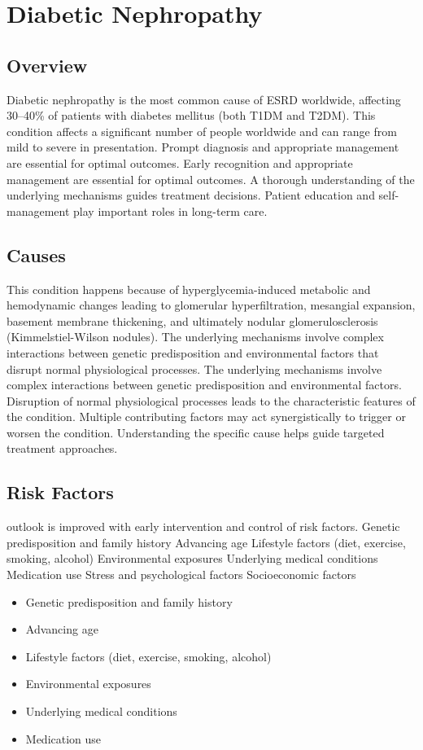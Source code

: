 \chapter{Diabetic Nephropathy}
\label{sec:Diabetic Nephropathy}

\section{Overview}
Diabetic nephropathy is the most common cause of ESRD worldwide, affecting 30--40\% of patients with diabetes mellitus (both T1DM and T2DM). This condition affects a significant number of people worldwide and can range from mild to severe in presentation. Prompt diagnosis and appropriate management are essential for optimal outcomes. Early recognition and appropriate management are essential for optimal outcomes. A thorough understanding of the underlying mechanisms guides treatment decisions. Patient education and self-management play important roles in long-term care.
\section{Causes}
This condition happens because of hyperglycemia-induced metabolic and hemodynamic changes leading to glomerular hyperfiltration, mesangial expansion, basement membrane thickening, and ultimately nodular glomerulosclerosis (Kimmelstiel-Wilson nodules). The underlying mechanisms involve complex interactions between genetic predisposition and environmental factors that disrupt normal physiological processes. The underlying mechanisms involve complex interactions between genetic predisposition and environmental factors. Disruption of normal physiological processes leads to the characteristic features of the condition. Multiple contributing factors may act synergistically to trigger or worsen the condition. Understanding the specific cause helps guide targeted treatment approaches.
\section{Risk Factors}
outlook is improved with early intervention and control of risk factors. Genetic predisposition and family history Advancing age Lifestyle factors (diet, exercise, smoking, alcohol) Environmental exposures Underlying medical conditions Medication use Stress and psychological factors Socioeconomic factors

\begin{itemize}[noitemsep]
  \item Genetic predisposition and family history
  \item Advancing age
  \item Lifestyle factors (diet, exercise, smoking, alcohol)
  \item Environmental exposures
  \item Underlying medical conditions
  \item Medication use
\end{itemize}
